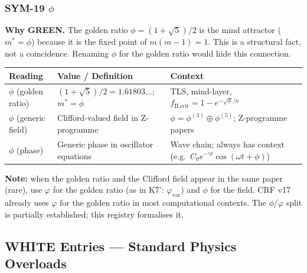 \documentclass[12pt, a4paper]{article}
\begin{document}
\subsubsection*{SYM-19 \quad $\phi$}

\begin{greenbox}[title={SYM-19 \textmd{---} $\phi$ \textmd{(golden ratio / field / phase — intentional)}}]
\textbf{Why GREEN.} The golden ratio $\phi = (1+\sqrt{5})/2$ is
the mind attractor ($m^* = \phi$) because it is the fixed point of
$m(m-1)=1$. This is a structural fact, not a coincidence. Renaming
$\phi$ for the golden ratio would hide this connection.

\medskip
\renewcommand{\arraystretch}{1.35}
\begin{tabular}{p{2.8cm} p{4.5cm} p{4.5cm}}
\toprule
\textbf{Reading} & \textbf{Value / Definition} & \textbf{Context}\\
\midrule
$\phi$ (golden ratio) &
  $(1+\sqrt{5})/2 = 1.61803\ldots$; $m^* = \phi$ &
  TLS, mind-layer, $f_{\text{II,crit}} = 1-e^{-\sqrt{\phi}/n}$\\
$\phi$ (generic field) &
  Clifford-valued field in Z-programme &
  $\phi = \phi^{(3)}\oplus\phi^{(5)}$; Z-programme papers\\
$\phi$ (phase) &
  Generic phase in oscillator equations &
  Wave chain; always has context (e.g.\ $C_0 e^{-\gamma t}\cos(\omega t+\phi)$)\\
\bottomrule
\end{tabular}

\medskip
\textbf{Note:} when the golden ratio and the Clifford field appear
in the same paper (rare), use $\varphi$ for the golden ratio
(as in K7': $\varphi_{\text{var}}$) and $\phi$ for the field.
CRF v17 already uses $\varphi$ for the golden ratio in most
computational contexts. The $\phi$/$\varphi$ split is partially
established; this registry formalises it.
\end{greenbox}

\subsection{WHITE Entries — Standard Physics Overloads}
\end{document}

